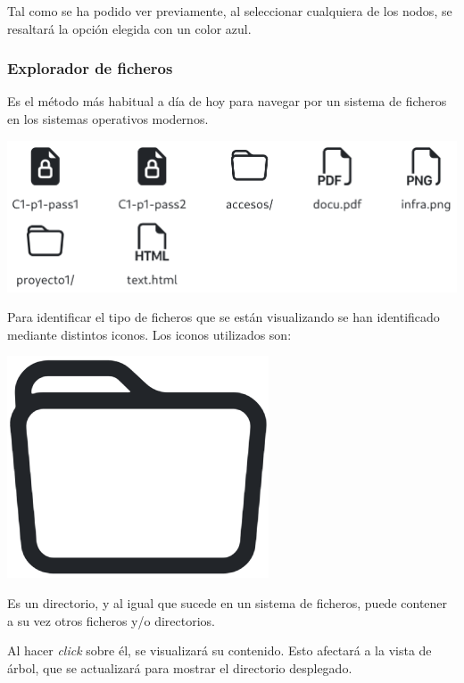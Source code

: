 \documentclass{\ClassPath/viu-tfm-template}
\begin{document}
Tal como se ha podido ver previamente, al seleccionar cualquiera de los nodos, se resaltará la opción elegida con un color azul.

\subsubsection*{Explorador de ficheros}

Es el método más habitual a día de hoy para navegar por un sistema de ficheros en los sistemas operativos modernos.

\begin{center}
    \includegraphics[width=0.9\linewidth]{img/browser.png}
\end{center}

Para identificar el tipo de ficheros que se están visualizando se han identificado mediante distintos iconos. Los iconos utilizados son:

{
\begin{minipage}{0.1\linewidth}
    \includegraphics[width=\linewidth]{img/folder.png}
\end{minipage}
\hspace{0.5cm}
\begin{minipage}{0.9\linewidth}
    Es un directorio, y al igual que sucede en un sistema de ficheros, puede contener a su vez otros ficheros y/o directorios.

    Al hacer \textit{click} sobre él, se visualizará su contenido. Esto afectará a la vista de árbol, que se actualizará para mostrar el directorio desplegado.
\end{minipage}
}
\end{document}
